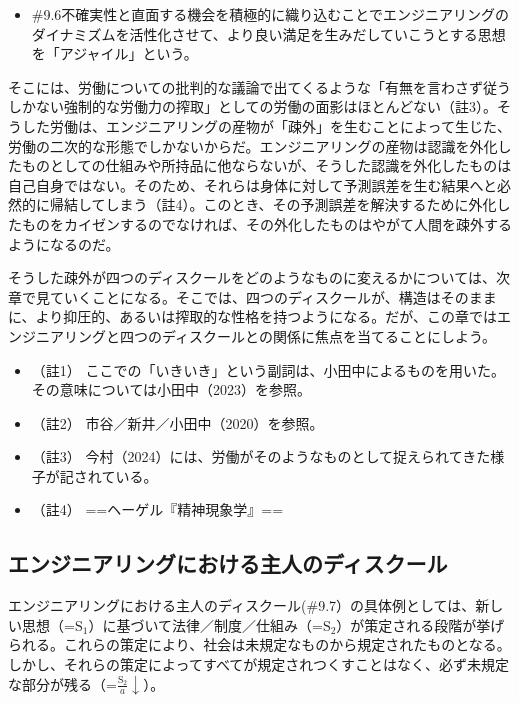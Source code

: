 \begin{note}{}
  \begin{itemize}
    \tightlist
    \item{\#9.6}不確実性と直面する機会を積極的に織り込むことでエンジニアリングのダイナミズムを活性化させて、より良い満足を生みだしていこうとする思想を「アジャイル」という。
  \end{itemize}
\end{note}

そこには、労働についての批判的な議論で出てくるような「有無を言わさず従うしかない強制的な労働力の搾取」としての労働の面影はほとんどない（註3）。そうした労働は、エンジニアリングの産物が「疎外」を生むことによって生じた、労働の二次的な形態でしかないからだ。エンジニアリングの産物は認識を外化したものとしての仕組みや所持品に他ならないが、そうした認識を外化したものは自己自身ではない。そのため、それらは身体に対して予測誤差を生む結果へと必然的に帰結してしまう（註4）。このとき、その予測誤差を解決するために外化したものをカイゼンするのでなければ、その外化したものはやがて人間を疎外するようになるのだ。

そうした疎外が四つのディスクールをどのようなものに変えるかについては、次章で見ていくことになる。そこでは、四つのディスクールが、構造はそのままに、より抑圧的、あるいは搾取的な性格を持つようになる。だが、この章ではエンジニアリングと四つのディスクールとの関係に焦点を当てることにしよう。

\begin{itemize}
\tightlist
\item
  （註1）
  ここでの「いきいき」という副詞は、小田中によるものを用いた。その意味については小田中（2023）\cite{Odanaka}を参照。
\item
  （註2） 市谷／新井／小田中（2020）\cite{IchitaniEtAl}を参照。
\item
  （註3）
  今村（2024）\cite{Imamura}には、労働がそのようなものとして捉えられてきた様子が記されている。
\item
  （註4） ==ヘーゲル『精神現象学』==
\end{itemize}

\subsection{エンジニアリングにおける主人のディスクール}\label{ux30a8ux30f3ux30b8ux30cbux30a2ux30eaux30f3ux30b0ux306bux304aux3051ux308bux4e3bux4ebaux306eux30c7ux30a3ux30b9ux30afux30fcux30eb}

エンジニアリングにおける主人のディスクール(\#9.7）の具体例としては、新しい思想（=\(\textrm{S}_1\)）に基づいて法律／制度／仕組み（=\(\textrm{S}_2\)）が策定される段階が挙げられる。これらの策定により、社会は未規定なものから規定されたものとなる。しかし、それらの策定によってすべてが規定されつくすことはなく、必ず未規定な部分が残る（=\(\frac{\textrm{S}_2}{a}\downarrow\)）。

